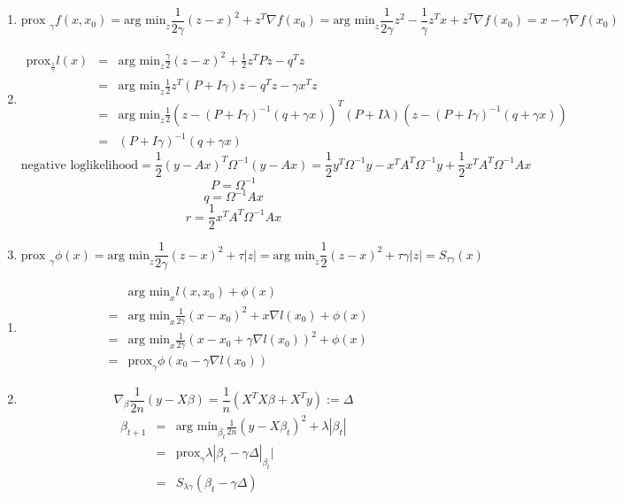 \documentclass{article}
\begin{document}
\begin{enumerate}[A]
\item
\[
\textrm{prox }_\gamma f(x,x_0)=\textrm{arg min}_z\frac{1}{2\gamma}(z-x)^2+z^T\nabla f(x_0)=\textrm{arg min}_z\frac{1}{2\gamma}z^2-\frac{1}{\gamma}z^Tx+z^T\nabla f(x_0)=x-\gamma\nabla f(x_0)
\]

\item
\begin{eqnarray}
\textrm{prox}_{\frac{1}{\gamma}}l(x)&=&\textrm{arg min}_z\frac{\gamma}{2}(z-x)^2+\frac{1}{2}z^TPz-q^Tz\nonumber\\
&=&\textrm{arg min}_z\frac{1}{2}z^T(P+I\gamma)z-q^Tz-\gamma x^Tz\nonumber\\
&=&\textrm{arg min}_z \frac{1}{2}(z-(P+I\gamma)^{-1}(q+\gamma x))^T(P+I\lambda)(z-(P+I\gamma)^{-1}(q+\gamma x))\nonumber\\
&=&(P+I\gamma)^{-1}(q+\gamma x)\nonumber
\end{eqnarray}
\[
\textrm{negative loglikelihood}=\frac{1}{2}(y-Ax)^T\Omega^{-1}(y-Ax)=\frac{1}{2}y^T\Omega^{-1}y-x^TA^T\Omega^{-1}y+\frac{1}{2}x^TA^T\Omega^{-1}Ax
\]
\[
P=\Omega^{-1}
\]
\[
q=\Omega^{-1}Ax
\]
\[
r=\frac{1}{2}x^TA^T\Omega^{-1}Ax
\]
\item
\[
\textrm{prox }_\gamma\phi(x)=\textrm{arg min}_z \frac{1}{2\gamma}(z-x)^2+\tau|z|=\textrm{arg min}_z \frac{1}{2}(z-x)^2+\tau\gamma|z|=S_{\tau\gamma}(x)
\]
\end{enumerate}
\begin{enumerate}[A]
\item
\begin{eqnarray}
&&\textrm{arg min}_x l(x,x_0)+\phi(x)\nonumber\\
&=&\textrm{arg min}_x \frac{1}{2\gamma}(x-x_0)^2+x\nabla l(x_0)+\phi(x)\nonumber\\
&=&\textrm{arg min}_x \frac{1}{2\gamma}(x-x_0+\gamma\nabla l(x_0))^2+\phi(x)\nonumber\\
&=&\textrm{prox}_\gamma\phi(x_0-\gamma\nabla l(x_0))\nonumber
\end{eqnarray}
\item
\[
\nabla_\beta\frac{1}{2n}(y-X\beta)=\frac{1}{n}(X^TX\beta+X^Ty):=\Delta
\]
\begin{eqnarray}
\beta_{t+1}&=&\textrm{arg min}_{\beta_t} \frac{1}{2n}(y-X\beta_t)^2+\lambda|\beta_t|\nonumber\\
&=&\textrm{prox}_{\gamma}\lambda|\beta_t-\gamma\Delta|_{\beta_t}|\nonumber\\
&=&S_{\lambda\gamma}(\beta_t-\gamma\Delta)
\end{eqnarray}
\end{enumerate}
\end{document}
